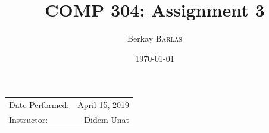 \documentclass{article}
\title{COMP 304: Assignment 3} %
\author{Berkay \textsc{Barlas}} %
\date{\today} %
\begin{document}
\maketitle %

\begin{center}
\begin{tabular}{l r}
Date Performed: & April 15, 2019 \\ %
Instructor: & Didem Unat %
\end{tabular}
\end{center}


\end{document}
